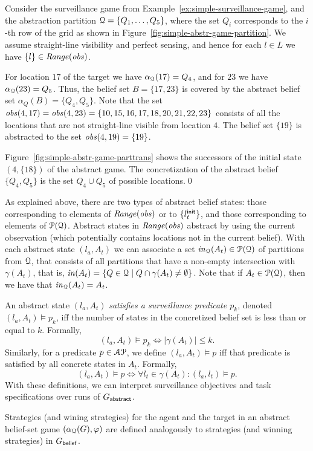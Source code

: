 \bigskip                                   
\begin{eg}\label{ex:simple-abstr-game}
Consider the surveillance game from Example~\ref{ex:simple-surveillance-game}, and the abstraction partition $\mathcal{Q} = \{Q_1,\ldots,Q_5\}$, where the set $Q_i$ corresponds to the $i$-th row of the grid as shown in Figure~\ref{fig:simple-abstr-game-partition}. We assume straight-line visibility and perfect sensing, and hence for each $l \in L$ we have $\{l\} \in \mathit{Range}(\mathit{obs})$.

For location $17$ of the target we have $\alpha_{\mathcal{Q}}(17) = Q_4$, and for  $23$ we have $\alpha_{\mathcal{Q}}(23) = Q_5$. Thus, the belief set $B = \{17,23\}$ is covered by the abstract belief set $\alpha_Q(B) = \{Q_4,Q_5\}$. Note that the set $\mathit{obs}(4,17) = \mathit{obs}(4,23) = \{10,15,16,17,18,20,21,22,23\}$ consists of all the locations that are not straight-line visible from location $4$.
%
The belief set $\{19\}$ is abstracted to the set $\mathit{obs}(4,19) = \{19\}$.

Figure~\ref{fig:simple-abstr-game-parttrans} shows the successors of the initial state $(4,\{18\})$ of the abstract game. The concretization of the abstract belief $\{Q_4,Q_5\}$ is the set $Q_4 \cup Q_5$ of possible locations.\qed
\end{eg}

\bigskip

As explained above, there are two types of abstract belief states: those corresponding to elements of $\mathit{Range}(\mathit{obs})$ or to $\{l_t^{\mathsf{init}}\}$, and those corresponding to elements of $\mathcal P(\mathcal{Q})$. Abstract states in $\mathit{Range}(\mathit{obs})$ abstract by using the current observation (which potentially contains locations not in the current belief).
With each abstract state $(l_a,A_t)$ we can associate a set $\mathit{in}_{\mathcal{Q}}(A_t) \in \mathcal{P}(\mathcal{Q})$ of partitions from $\mathcal{Q}$, that
consists of all partitions that have a non-empty intersection with $\gamma(A_t)$, that is, 
$\mathit{in}(A_t) = \{Q \in \mathcal{Q} \mid Q \cap \gamma(A_t) \neq \emptyset\}$. Note that if $A_t \in \mathcal P(\mathcal{Q})$, then we have that $\mathit{in}_{\mathcal{Q}}(A_t) = A_t$.

\bigskip

An abstract state $(l_a,A_t)$ \emph{satisfies a surveillance predicate $p_k$}, denoted $(l_a,A_t) \models p_k$, iff the number of states in the concretized belief set is less than or equal to $k$. Formally,
$$(l_a,A_t) \models p_k \Longleftrightarrow |\gamma(A_t)| \leq k.$$ Similarly, for a predicate $p \in \mathcal{AP}$, we define $(l_a,A_t) \models p$ iff that predicate is satisfied by all concrete states in $A_t$. Formally,
$$(l_a,A_t) \models p \Longleftrightarrow \forall l_t \in  \gamma(A_t): (l_a,l_t) \models p.$$
With these definitions, we can interpret surveillance objectives and task specifications over runs of $G_{\mathsf{abstract}}$.

Strategies (and wining strategies) for the agent and the target in an abstract belief-set game $(\alpha_{\mathcal{Q}}(G),\varphi)$ are defined analogously to strategies (and winning strategies) in $G_{\mathsf{belief}}$.